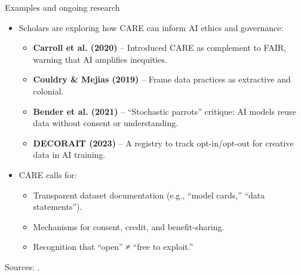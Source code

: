 \documentclass[aspectratio=169]{beamer}
\begin{document}
\begin{frame}{Examples and ongoing research}
\begin{itemize}
  \item Scholars are exploring how CARE can inform AI ethics and governance:
    \begin{itemize}
      \item \textbf{Carroll et al. (2020)} – Introduced CARE as complement to FAIR, warning that AI amplifies inequities.  
      \item \textbf{Couldry \& Mejias (2019)} – Frame data practices as extractive and colonial.  
      \item \textbf{Bender et al. (2021)} – “Stochastic parrots” critique: AI models reuse data without consent or understanding.  
      \item \textbf{DECORAIT (2023)} – A registry to track opt-in/opt-out for creative data in AI training.  
    \end{itemize}
  \item CARE calls for:
    \begin{itemize}
      \item Transparent dataset documentation (e.g., “model cards,” “data statements”).  
      \item Mechanisms for consent, credit, and benefit-sharing.  
      \item Recognition that “open” ≠ “free to exploit.”
    \end{itemize}
\end{itemize}
\medskip
\small Sources: \citep{CARE2020, bender2021stochastic, couldry2019datacolonialism, decoraait2023registry}.
\end{frame}
\end{document}
